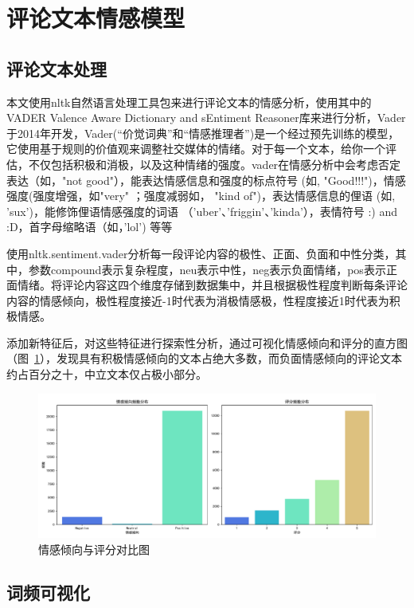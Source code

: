 \documentclass[
  journal=medium,
  manuscript=article-type,
  year=2023,
  volume=37,
]{cup-journal}
\begin{document}
\section{评论文本情感模型}

\subsection{评论文本处理}

本文使用nltk自然语言处理工具包来进行评论文本的情感分析，使用其中的VADER Valence Aware Dictionary and sEntiment Reasoner库来进行分析，Vader于2014年开发，Vader(“价觉词典”和“情感推理者”)是一个经过预先训练的模型，它使用基于规则的价值观来调整社交媒体的情绪。对于每一个文本，给你一个评估，不仅包括积极和消极，以及这种情绪的强度。vader在情感分析中会考虑否定表达（如，"not good"），能表达情感信息和强度的标点符号 (如, "Good!!!")，情感强度(强度增强，如"very" ；强度减弱如， "kind of")，表达情感信息的俚语 (如, 'sux')，能修饰俚语情感强度的词语 （'uber'、'friggin'、'kinda'），表情符号 :) and :D，首字母缩略语（如，'lol') 等等

​使用nltk.sentiment.vader分析每一段评论内容的极性、正面、负面和中性分类，其中，参数compound表示复杂程度，neu表示中性，neg表示负面情绪，pos表示正面情绪。将评论内容这四个维度存储到数据集中，并且根据极性程度判断每条评论内容的情感倾向，极性程度接近-1时代表为消极情感极，性程度接近1时代表为积极情感。

添加新特征后，对这些特征进行探索性分析，通过可视化情感倾向和评分的直方图（图~\ref{sentirate}），发现具有积极情感倾向的文本占绝大多数，而负面情感倾向的评论文本约占百分之十，中立文本仅占极小部分。

\begin{figure}[hbt!]
    \centering
    \includegraphics[width=0.8\linewidth]{sentirate.pdf}
    \caption{情感倾向与评分对比图}
    \label{sentirate}
\end{figure}


\subsection{词频可视化}
\end{document}
